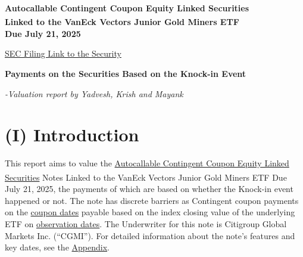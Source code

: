 \documentclass[12pt,a4paper]{article}
\begin{document}
\begin{center}
{\color{americanblue}\Large\textbf{Autocallable Contingent Coupon Equity Linked Securities\\
Linked to the VanEck Vectors\textsuperscript{\textregistered} Junior Gold Miners ETF\\
Due July 21, 2025}}

\vspace{0.2cm}
{\color{americanblue}\large\href{https://www.sec.gov/Archives/edgar/data/200245/000148105724000574/form424b2.htm}{SEC Filing Link to the Security}}

\vspace{0.2cm}
{\color{americanblue}\Large\textbf{Payments on the Securities Based on the Knock-in Event}}

\vspace{0.2cm}
{\small\textit{-Valuation report by Yadvesh, Krish and Mayank}}
\end{center}

\vspace{1ex}

\section*{(I) Introduction}

This report aims to value the \underline{Autocallable Contingent Coupon Equity Linked Securities} Notes Linked to the VanEck Vectors\textsuperscript{\textregistered} Junior Gold Miners ETF Due July 21, 2025, the payments of which are based on whether the Knock-in event happened or not. The note has discrete barriers as Contingent coupon payments on the \hyperref[app:dates]{coupon dates} payable based on the index closing value of the underlying ETF on \hyperref[app:dates]{observation dates}. The Underwriter for this note is Citigroup Global Markets Inc. (“CGMI”). For detailed information about the note's features and key dates, see the \hyperref[app:keydates]{Appendix}.

\vspace{0.5cm}
\end{document}
